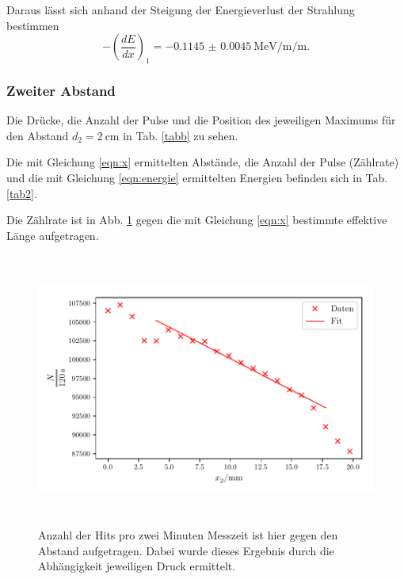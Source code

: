 \noindent Daraus lässt sich anhand der Steigung der Energieverlust der Strahlung bestimmen %
\begin{equation*}
    - \left( \frac{dE}{dx} \right)_1 = - \SI{0.1145(45)}{\mega\electronvolt\per\milli\per\meter}.
\end{equation*}

\subsubsection{Zweiter Abstand}
Die Drücke, die Anzahl der Pulse und die Position des jeweiligen Maximums für den Abstand $d_2 = \SI{2}{\centi\meter}$ in Tab. \ref{tabb} zu sehen.
 
 

Die mit Gleichung \eqref{eqn:x} ermittelten Abstände, die Anzahl der Pulse (Zählrate) und die mit Gleichung \eqref{eqn:energie} ermittelten Energien befinden sich in Tab. \ref{tab2}. 

 

\noindent Die Zählrate ist in Abb. \ref{zaehlrate2} gegen die mit Gleichung \eqref{eqn:x} bestimmte effektive Länge aufgetragen.

\begin{figure}
    \centering
    \includegraphics[width=12cm, height=9cm]{build/plotc.pdf}
    \caption{Anzahl der Hits pro zwei Minuten Messzeit ist hier gegen den Abstand aufgetragen. Dabei wurde dieses Ergebnis durch die Abhängigkeit jeweiligen Druck ermittelt.}
    \label{zaehlrate2}
\end{figure}

